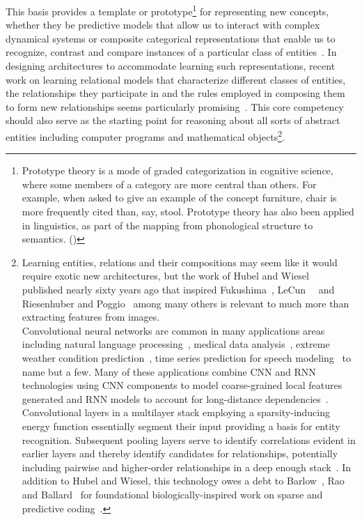 This basis provides a template or prototype\footnote{%
%
  Prototype theory is a mode of graded categorization in cognitive science, where some members of a category are more central than others. For example, when asked to give an example of the concept furniture, chair is more frequently cited than, say, stool. Prototype theory has also been applied in linguistics, as part of the mapping from phonological structure to semantics. ({})}
%
for representing new concepts, whether they be predictive models that allow us to interact with complex dynamical systems or composite categorical representations that enable us to recognize, contrast and compare instances of a particular class of entities~\cite{RoschNATURAL-CATEGORIES-95,RoschNATURAL-CATEGORIES-91,VarelaThompsonRoschTHE_EMBODIED_MIND-91}. 
%
In designing architectures to accommodate learning such representations, recent work on learning relational models that characterize different classes of entities, the relationships they participate in and the rules employed in composing them to form new relationships seems particularly promising~\cite{SanchezetalCoRR-18,HamricketalCoRR-18,SantoroetalNIPS-17,BattagliaetalNIPS-16}. This core competency should also serve as the starting point for reasoning about all sorts of abstract entities including computer programs and mathematical objects\footnote{%
%
  Learning entities, relations and their compositions may seem like it would require exotic new architectures, but the work of Hubel and Wiesel~\cite{HubelandWieselJoP-62,HubelandWieselJoP-61} published nearly sixty years ago that inspired Fukushima~\cite{FukushimaBC-80}, LeCun~\etal{}~\cite{LecunetalIEEE-98} and Riesenhuber and Poggio~\cite{RiesenhuberandPoggioNN-99} among many others is relevant to much more than extracting features from images.\\
  Convolutional neural networks are common in many applications areas including natural language processing~\cite{KimEMNLP-14}, medical data analysis~\cite{Luetal2017medical}, extreme weather condition prediction~\cite{LiuetalCoRR-16}, time series prediction for speech modeling~\cite{vandenOordCoRR-16} to name but a few. Many of these applications combine CNN and RNN technologies using CNN components to model coarse-grained local features generated and RNN models to account for long-distance dependencies~\cite{WangetalCOLING-16}.\\
  Convolutional layers in a multilayer stack employing a sparsity-inducing energy function essentially segment their input providing a basis for entity recognition. Subsequent pooling layers serve to identify correlations evident in earlier layers and thereby identify candidates for relationships, potentially including pairwise and higher-order relationships in a deep enough stack~\cite{SantoroetalNIPS-17}. In addition to Hubel and Wiesel, this technology owes a debt to Barlow~\cite{BarlowNC-89,Barlow61}, Rao and Ballard~\cite{RaoandBallardNATURE-NEUROSCIENCE-99} for foundational biologically-inspired work on sparse and predictive coding~\cite{ChalketalPNAS-18}.}.

